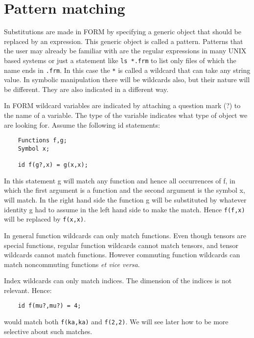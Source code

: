 \chapter{Pattern matching}
\label{pattern}

Substitutions are made in FORM 
by specifying a generic object that should be replaced by an expression. 
This generic object is called a pattern. Patterns that the 
user may already be familiar with are the regular expressions in many 
UNIX based systems or just a statement like \verb:ls *.frm: to 
list only files of which the name ends in \verb:.frm:. In this case the 
\verb:*: is called a wildcard that can take any string 
value. In symbolic manipulation there will be wildcards also, but their 
nature will be different. They are also indicated in a different way.

In FORM wildcard variables are indicated by attaching a 
question mark (?) to the name of a variable. The type 
of the variable indicates what type of object we are looking for. Assume 
the following id statements:
\begin{verbatim}
    Functions f,g;
    Symbol x;

    id f(g?,x) = g(x,x);
\end{verbatim}
In this statement g will match any function and hence all occurrences 
of f, in which the first argument is a function and the second argument is 
the symbol x, will match. In the right hand side the function g will be 
substituted by whatever identity g had to assume in the left hand side to 
make the match. Hence \verb:f(f,x): will be replaced by \verb:f(x,x):.

In general function wildcards can only match 
functions. Even though tensors are special functions, regular function 
wildcards cannot match tensors, and tensor wildcards cannot match 
functions. However commuting function wildcards can match 
noncommuting functions {\sl et vice versa}.

Index wildcards can only match indices. The 
dimension of the indices is not relevant. Hence:
\begin{verbatim}
    id f(mu?,mu?) = 4;
\end{verbatim}
would match both \verb:f(ka,ka): and \verb:f(2,2):. We will see later 
how to be more selective about such matches.

